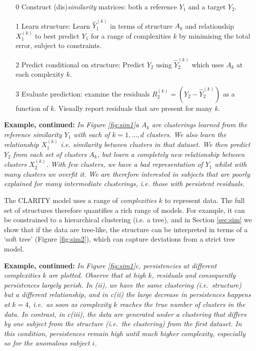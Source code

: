 \documentclass[a4]{article}
\newcommand{\+}[1]{\mathbf{#1}}
\begin{document}
\begin{enumerate}
\item[0] Construct (dis)\emph{similarity} matrices: both a reference $Y_1$ and a target $Y_2$.
\item[1] Learn structure: Learn  $\hat{Y}_{1}^{(k)}$ in terms of structure $A_k$ and relationship $X^{(k)}_1$ to best predict $Y_1$ for a range of complexities $k$ by minimising the total error, subject to constraints. %
\item[2] Predict conditional on structure:  Predict $Y_2$ using $\hat{Y}_{2}^{(k)}$ which uses $A_k$ at each complexity $k$. %
\item[3] Evaluate prediction: examine the residuals $R_{2}^{(k)} = \left(Y_2 -  \hat{Y}_{2}^{(k)} \right)$ as a function of $k$. Visually report residuals that are present for many $k$.
\end{enumerate}

\textbf{Example, continued:} {\it In Figure \ref{fig:sim1}a $A_k$ are clusterings learned from the reference similarity $Y_1$ with each of $k=1, \ldots, d$ clusters. We also learn the relationship $X^{(k)}_1$ i.e. similarity between clusters in that dataset. We then predict $Y_2$ from each set of clusters $A_k$, but learn a completely new relationship between clusters $X^{(k)}_2$. With few clusters, we have a bad representation of $Y_1$ whilst with many clusters we overfit it. We are therefore interested in subjects that are poorly explained for many intermediate clusterings, i.e. those with persistent residuals.}

The CLARITY model uses a range of \emph{complexities} $k$ to represent data. The full set of structures therefore quantifies a rich range of models. For example, it can be constrained to a hierarchical clustering (i.e. a tree), and in Section \ref{sec:sim} we show that if the data are tree-like, the structure can be interpreted in terms of a `soft tree' (Figure \ref{fig:sim2}), which can capture deviations from a strict tree model.

\textbf{Example, continued:} \emph{In Figure \ref{fig:sim1}c, persistencies at different complexities $k$ are plotted. Observe that at high $k$, residuals and consequently persistences largely perish. In (ii), we have the same clustering (i.e.~structure) but a different relationship, and in c(ii) the large decrease in persistences happens at $k=4$, i.e.~as soon as complexity $k$ reaches the true number of clusters in the data. In contrast, in c(iii), the data are generated under a clustering that differs by one subject from the structure (i.e.~the clustering) from the first dataset. In this condition, persistences remain high until much higher complexity, especially so for the anomalous subject $i$. }
\end{document}

